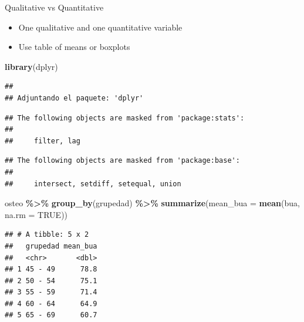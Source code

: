 \documentclass[
  ignorenonframetext,
]{beamer}
\newenvironment{Shaded}{\begin{snugshade}}{\end{snugshade}}
\newcommand{\AttributeTok}[1]{\textcolor[rgb]{0.13,0.29,0.53}{#1}}
\newcommand{\ConstantTok}[1]{\textcolor[rgb]{0.56,0.35,0.01}{#1}}
\newcommand{\FunctionTok}[1]{\textcolor[rgb]{0.13,0.29,0.53}{\textbf{#1}}}
\newcommand{\NormalTok}[1]{#1}
\newcommand{\SpecialCharTok}[1]{\textcolor[rgb]{0.81,0.36,0.00}{\textbf{#1}}}
\providecommand{\tightlist}{%
  \setlength{\itemsep}{0pt}\setlength{\parskip}{0pt}}
\begin{document}
\begin{frame}[fragile]{Qualitative vs Quantitative}
\label{qualitative-vs-quantitative}
\begin{itemize}
\tightlist
\item
  One qualitative and one quantitative variable
\item
  Use table of means or boxplots
\end{itemize}

\begin{Shaded}
\begin{Highlighting}[]
\FunctionTok{library}\NormalTok{(dplyr)}
\end{Highlighting}
\end{Shaded}

\begin{verbatim}
## 
## Adjuntando el paquete: 'dplyr'
\end{verbatim}

\begin{verbatim}
## The following objects are masked from 'package:stats':
## 
##     filter, lag
\end{verbatim}

\begin{verbatim}
## The following objects are masked from 'package:base':
## 
##     intersect, setdiff, setequal, union
\end{verbatim}

\begin{Shaded}
\begin{Highlighting}[]
\NormalTok{osteo }\SpecialCharTok{\%\textgreater{}\%}
  \FunctionTok{group\_by}\NormalTok{(grupedad) }\SpecialCharTok{\%\textgreater{}\%}
  \FunctionTok{summarize}\NormalTok{(}\AttributeTok{mean\_bua =} \FunctionTok{mean}\NormalTok{(bua, }\AttributeTok{na.rm =} \ConstantTok{TRUE}\NormalTok{))}
\end{Highlighting}
\end{Shaded}

\begin{verbatim}
## # A tibble: 5 x 2
##   grupedad mean_bua
##   <chr>       <dbl>
## 1 45 - 49      78.8
## 2 50 - 54      75.1
## 3 55 - 59      71.4
## 4 60 - 64      64.9
## 5 65 - 69      60.7
\end{verbatim}
\end{frame}
\end{document}
